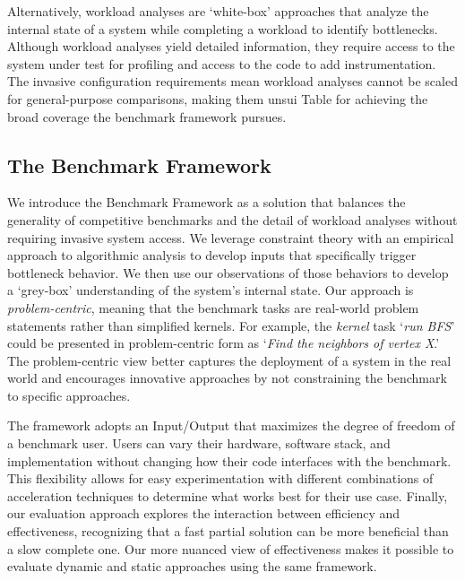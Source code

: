 Alternatively, workload analyses are `white-box' approaches that analyze the internal state of a system while completing a workload to identify bottlenecks. 
Although workload analyses yield detailed information, they require access to the system under test for profiling and access to the code to add instrumentation. 
The invasive configuration requirements mean workload analyses cannot be scaled for general-purpose comparisons, making them unsui Table for achieving the broad coverage the \gai benchmark framework pursues.

\subsection{The \gai Benchmark Framework}
We introduce the \gai Benchmark Framework as a solution that balances the generality of competitive benchmarks and the detail of workload analyses without requiring invasive system access. 
We leverage constraint theory with an empirical approach to algorithmic analysis to develop inputs that specifically trigger bottleneck behavior. 
We then use our observations of those behaviors to develop a `grey-box' understanding of the system's internal state. 
Our approach is \textit{problem-centric}, meaning that the benchmark tasks are real-world problem statements rather than simplified kernels. 
For example, the \textit{kernel} task `\textit{run \ac{BFS}}' could be presented in problem-centric form as `\textit{Find the neighbors of vertex X}.'
The problem-centric view better captures the deployment of a system in the real world and encourages innovative approaches by not constraining the benchmark to specific approaches. 

The framework adopts an Input/Output that maximizes the degree of freedom of a benchmark user. 
Users can vary their hardware, software stack, and implementation without changing how their code interfaces with the benchmark. 
This flexibility allows for easy experimentation with different combinations of acceleration techniques to determine what works best for their use case. 
Finally, our evaluation approach explores the interaction between efficiency and effectiveness, recognizing that a fast partial solution can be more beneficial than a slow complete one.
Our more nuanced view of effectiveness makes it possible to evaluate dynamic and static approaches using the same framework.

